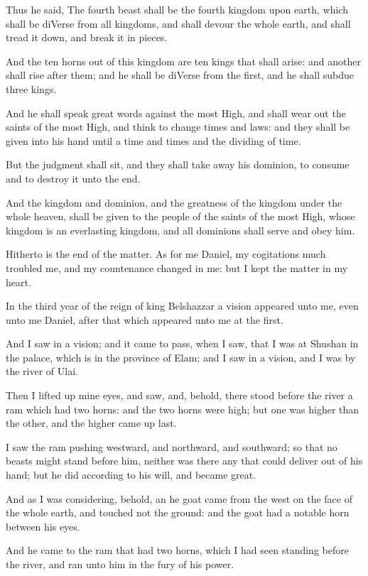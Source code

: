 \Verse Thus he said, The fourth beast shall be the fourth kingdom upon earth, which shall be diVerse from all kingdoms, and shall devour the whole earth, and shall tread it down, and break it in pieces.

\Verse And the ten horns out of this kingdom are ten kings that shall arise: and another shall rise after them; and he shall be diVerse from the first, and he shall subdue three kings.

\Verse And he shall speak great words against the most High, and shall wear out the saints of the most High, and think to change times and laws: and they shall be given into his hand until a time and times and the dividing of time.

\Verse But the judgment shall sit, and they shall take away his dominion, to consume and to destroy it unto the end.

\Verse And the kingdom and dominion, and the greatness of the kingdom under the whole heaven, shall be given to the people of the saints of the most High, whose kingdom is an everlasting kingdom, and all dominions shall serve and obey him.

\Verse Hitherto is the end of the matter. As for me Daniel, my cogitations much troubled me, and my countenance changed in me: but I kept the matter in my heart.


\Chapter
\Verse In the third year of the reign of king Belshazzar a vision appeared unto me, even unto me Daniel, after that which appeared unto me at the first.

\Verse And I saw in a vision; and it came to pass, when I saw, that I was at Shushan in the palace, which is in the province of Elam; and I saw in a vision, and I was by the river of Ulai.

\Verse Then I lifted up mine eyes, and saw, and, behold, there stood before the river a ram which had two horns: and the two horns were high; but one was higher than the other, and the higher came up last.

\Verse I saw the ram pushing westward, and northward, and southward; so that no beasts might stand before him, neither was there any that could deliver out of his hand; but he did according to his will, and became great.

\Verse And as I was considering, behold, an he goat came from the west on the face of the whole earth, and touched not the ground: and the goat had a notable horn between his eyes.

\Verse And he came to the ram that had two horns, which I had seen standing before the river, and ran unto him in the fury of his power.


